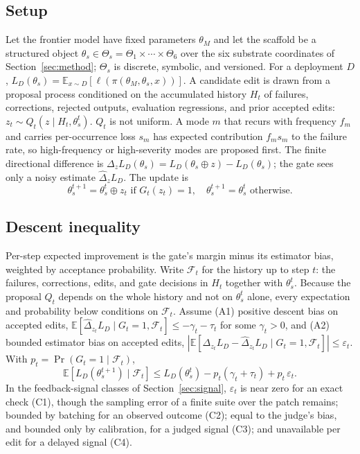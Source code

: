 \subsection{Setup}\label{setup}

Let the frontier model have fixed parameters \(\theta_M\) and let the scaffold be a structured object \(\theta_s \in \Theta_s = \Theta_1 \times \cdots \times \Theta_6\) over the six substrate coordinates of Section~\ref{sec:method}; \(\Theta_s\) is discrete, symbolic, and versioned. For a deployment \(D\), \(L_D(\theta_s) = \mathbb{E}_{x \sim D}[\ell(\pi(\theta_M, \theta_s, x))]\). A candidate edit is drawn from a proposal process conditioned on the accumulated history \(H_t\) of failures, corrections, rejected outputs, evaluation regressions, and prior accepted edits: \(z_t \sim Q_t(z \mid H_t, \theta_s^t)\). \(Q_t\) is not uniform. A mode \(m\) that recurs with frequency \(f_m\) and carries per-occurrence loss \(s_m\) has expected contribution \(f_m s_m\) to the failure rate, so high-frequency or high-severity modes are proposed first. The finite directional difference is \(\Delta_z L_D(\theta_s) = L_D(\theta_s \oplus z) - L_D(\theta_s)\); the gate sees only a noisy estimate \(\widehat{\Delta}_z L_D\). The update is \[\theta_s^{t+1} = \theta_s^t \oplus z_t \text{ if } G_t(z_t) = 1, \quad \theta_s^{t+1} = \theta_s^t \text{ otherwise.}\]

\subsection{Descent inequality}\label{descent-inequality}

Per-step expected improvement is the gate's margin minus its estimator bias, weighted by acceptance probability. Write \(\mathcal{F}_t\) for the history up to step \(t\): the failures, corrections, edits, and gate decisions in \(H_t\) together with \(\theta_s^t\). Because the proposal \(Q_t\) depends on the whole history and not on \(\theta_s^t\) alone, every expectation and probability below conditions on \(\mathcal{F}_t\). Assume (A1) positive descent bias on accepted edits, \(\mathbb{E}[\widehat{\Delta}_{z_t} L_D \mid G_t = 1, \mathcal{F}_t] \le -\gamma_t - \tau_t\) for some \(\gamma_t > 0\), and (A2) bounded estimator bias on accepted edits, \(|\mathbb{E}[\Delta_{z_t} L_D - \widehat{\Delta}_{z_t} L_D \mid G_t = 1, \mathcal{F}_t]| \le \varepsilon_t\). With \(p_t = \Pr(G_t = 1 \mid \mathcal{F}_t)\), \[\mathbb{E}[L_D(\theta_s^{t+1}) \mid \mathcal{F}_t] \le L_D(\theta_s^t) - p_t(\gamma_t + \tau_t) + p_t\,\varepsilon_t.\] In the feedback-signal classes of Section~\ref{sec:signal}, \(\varepsilon_t\) is near zero for an exact check (C1), though the sampling error of a finite suite over the patch remains; bounded by batching for an observed outcome (C2); equal to the judge's bias, and bounded only by calibration, for a judged signal (C3); and unavailable per edit for a delayed signal (C4).

